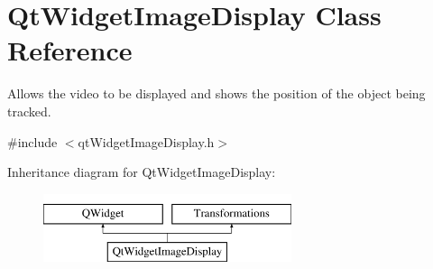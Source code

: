 \hypertarget{class_qt_widget_image_display}{}\section{Qt\+Widget\+Image\+Display Class Reference}
\label{class_qt_widget_image_display}


Allows the video to be displayed and shows the position of the object being tracked.  




{\ttfamily \#include $<$qt\+Widget\+Image\+Display.\+h$>$}

Inheritance diagram for Qt\+Widget\+Image\+Display\+:\begin{figure}[H]
\begin{center}
\leavevmode
\includegraphics[height=2.000000cm]{class_qt_widget_image_display}
\end{center}
\end{figure}
